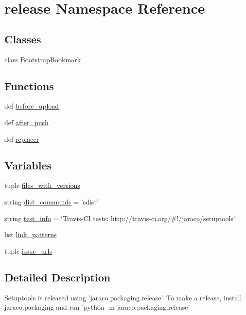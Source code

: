 \hypertarget{namespacerelease}{}\section{release Namespace Reference}
\label{namespacerelease}
\subsection*{Classes}
\begin{DoxyCompactItemize}
\item 
class \hyperlink{classrelease_1_1BootstrapBookmark}{Bootstrap\+Bookmark}
\end{DoxyCompactItemize}
\subsection*{Functions}
\begin{DoxyCompactItemize}
\item 
def \hyperlink{namespacerelease_a80c98233e626d41c4005c8e51a756a6d}{before\+\_\+upload}
\item 
def \hyperlink{namespacerelease_aaa425fd6a5cbd85efb59d2fa0ca46c03}{after\+\_\+push}
\item 
def \hyperlink{namespacerelease_a3cef74b89497ef827d121004a9462c09}{replacer}
\end{DoxyCompactItemize}
\subsection*{Variables}
\begin{DoxyCompactItemize}
\item 
tuple \hyperlink{namespacerelease_a8cd1b51d6bdeee649973fc036c88d60e}{files\+\_\+with\+\_\+versions}
\item 
string \hyperlink{namespacerelease_aa2fa350eff6ae27ff924d15e569b29a7}{dist\+\_\+commands} = 'sdist'
\item 
string \hyperlink{namespacerelease_ab36a1058381a20624c07d89430a50083}{test\+\_\+info} = \char`\"{}Travis-\/C\+I tests\+: http\+://travis-\/ci.\+org/\#!/jaraco/setuptools\char`\"{}
\item 
list \hyperlink{namespacerelease_a10e23691424654f839adbf69d9d69b4c}{link\+\_\+patterns}
\item 
tuple \hyperlink{namespacerelease_a11d939c4d1ec94f21a0cfd7e180f1735}{issue\+\_\+urls}
\end{DoxyCompactItemize}


\subsection{Detailed Description}
\begin{DoxyVerb}Setuptools is released using 'jaraco.packaging.release'. To make a release,
install jaraco.packaging and run 'python -m jaraco.packaging.release'
\end{DoxyVerb}
 

